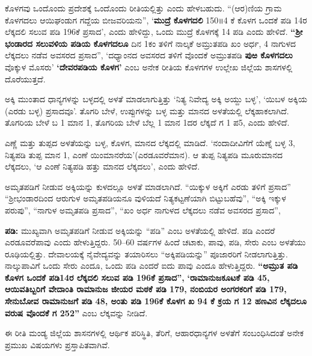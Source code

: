 ಕೊಳಗವು ಒಂದೊಂದು ಪ್ರದೇಶಕ್ಕೆ ಒಂದೊಂದು ರೀತಿಯಲ್ಲಿತ್ತು ಎಂದು ಹೇಳಬಹುದು. “(ಆರ)ಣಿಯ ಗ್ರಾಮ ಕೊಳಗದಲು ಆಯಿಘಂಡುಗ ಗದ್ದೆಯ ಬೀಜವರಿಯನು”, ‘\textbf{ಮುದ್ರೆ ಕೊಳಗದಲಿ} 150॥4 ಕೆ ಕೊಳಗ ಒಂದಕೆ ಪಡಿ 14ರ ಲೆಕ್ಕದಲಿ ಸಲುವ ಪಡಿ 196ಕೆ ಪ್ರಸಾದ’, ಎಂದು ಹೇಳಿದ್ದು, ಒಂದು ಮುದ್ರೆ ಕೊಳಗಕ್ಕೆ 14 ಪಡಿ ಎಂದು ಹೇಳಿದೆ. \textbf{“ಶ‍್ರೀ} \textbf{ಭಂಡಾರದ ಸಲುವಳಿಯ ಪಡಿಯ ಕೊಳಗದಲೂ} ದಿನ 1ಕಂ ತಳಿಗೆ ನಾಲ್ಕಕೆ ಅಮ್ರುತಪಡಿ ಖಂ ಅರ್ಧ, 4 ನಾಗುಳದ ಲೆಕ್ಕದಲು ನಡೆವ ಅವಸರದ ಪ್ರಸಾದ”, ‘ದಧ್ಯಾಂನದ ಅವಸರದ ತಳಿಗೆ ವೊಂದಕೆ ಅಮ್ರುತಪಡಿ \textbf{ಪುಱ ಕೊಳಗದಲು} ವೊಕ್ಕುಳ ಮೊಸರು’ \textbf{‘ದೇವರಪಡಿಯ ಕೊಳಗ’} ಎಂಬ ಅನೇಕ ರೀತಿಯ ಕೊಳಗಗಳ ಉಲ್ಲೇಖ ಜಿಲ್ಲೆಯ ಶಾಸಗಳಲ್ಲಿ ದೊರೆಯುತ್ತದೆ.

ಅಕ್ಕಿ ಮುಂತಾದ ಧಾನ್ಯಗಳನ್ನು ಬಳ್ಳದಲ್ಲಿ ಅಳತೆ ಮಾಡಲಾಗುತ್ತಿತ್ತು ‘ನಿತ್ಯ ನಿವೇದ್ಯ ಅಕ್ಕಿ ಅಯ್ದು ಬಳ್ಳ’, ‘ಯಿಬಳ ಅಕ್ಕಿಯ (ಎರಡು ಬಳ್ಳ) ಪ್ರಸಾದವೂ’. ತೊಗರಿ ಬೇಳೆ, ಉಪ್ಪುಗಳನ್ನು ಬಳ್ಳ ಮತ್ತು ಮಾನದ ಅಳತೆಯಲ್ಲಿ ಲೆಕ್ಕಹಾಕಲಾಗಿದೆ. ತೊಗರಿಯ ಬೇಳೆ ಬ 1 ಮಾನ 1, ತೊಗರಿಯ ಬೇಳೆ ಬೆಲ್ಲ 1 ಮಾನ 1ದರ ಲೆಕ್ಕದೆ ಗ 1 ಪ5, ಎಂದು ಹೇಳಿದೆ.

ಎಣ್ಣೆ ಮತ್ತು ತುಪ್ಪದ ಅಳತೆಯನ್ನು ಬಳ್ಳ, ಕೊಳಗ, ಮಾನದ ಲೆಕ್ಕದಲ್ಲಿ ಮಾಡಿದೆ. ‘ನಂದಾದೀವಿಗೆಗೆ ಯೆಣ್ನೆ ಬಳ್ಳ 3, ನಿತ್ಯಪಡಿ ತುಪ್ಪ ಮಾನ 1, ಎಂಣೆ ಯಿಂಮಾನರೆಯ’(ಎರಡೂವರೆಮಾನ). ಆ ತುಪ್ಪ ನಿತ್ಯಪಡಿ ಮೂರುಮಾನದ ಲೆಕ್ಕದಲು, ‘ಆ ಎಂಣೆ ನಿತ್ಯಪಡಿ ಹತ್ತು ಮಾನದ ಲೆಕ್ಕದಲು’, ಎಂದು ಹೇಳಿದೆ.

ಅಮೃತಪಡಿಗೆ ನೀಡುವ ಅಕ್ಕಿಯನ್ನು ಕುಳದಲ್ಲೂ ಅಳತೆ ಮಾಡಲಾಗಿದೆ. “ಯಿಕ್ಕುಳ ಅಕ್ಕಿಗೆ ಎರಡು ತಳಿಗೆ ಪ್ರಸಾದ” “ಶ‍್ರೀಭಂಡಾರದಿಂದ ಆರುಗುಳ ಅಮೃತಪಡಿಯನೂ ವುಳಿಯದೆ ನಿತ್ಯಕಟ್ಟಣೆಯಾಗಿ ಬಿಟ್ಟುಬಹೆವು”, “ಅಕ್ಕಿ ಇಕ್ಕುಳ ಪರುಪು”, “ನಾಗುಳ ಅಮೃತಪಡಿ ಪ್ರಸಾದ”, “ಖಂ ಅರ್ಧ ನಾಗುಳದ ಲೆಕ್ಕದಲು ನಡೆವ ಅವಸರದ ಪ್ರಸಾದ”,

\textbf{ಪಡಿ:} ಮುಖ್ಯವಾಗಿ ಅಮೃತಪಡಿಗೆ ನೀಡುವ ಅಕ್ಕಿಯನ್ನು “ಪಡಿ” ಎಂಬ ಅಳತೆಯಲ್ಲಿ ಹೇಳಿದೆ. ಪಡಿ ಎಂದರೆ ಎರಡೂವರೆಪಾವು ಎಂದು ಹೇಳುತ್ತಿದ್ದರು. 50–60 ವರ್ಷಗಳ ಹಿಂದೆ ಚಟಾಕು, ಪಾವು, ಪಡಿ, ಸೇರು ಎಂಬ ಅಳತೆಯು ರೂಢಿಯಲ್ಲಿತ್ತು. ದೇವಾಲಯಕ್ಕೆ ನೈವೇದ್ಯವನ್ನು ತಯಾರಿಸಲು “ಅಕ್ಕಿಪಡಿಯನ್ನು” ಪೂಜಾರರಿಗೆ ನೀಡಲಾಗುತ್ತಿತ್ತು. ನಾಲ್ಕುಪಾವಿಗೆ ಒಂದು ಸೇರು ಎಂದೂ, ಒಂದು ಪಡಿ ಎಂದರೆ ಐದು ಪಾವು ಎಂದೂ ಹೇಳುತ್ತಿದ್ದರು. \textbf{“ಅಮ್ರುತ ಪಡಿ ಕೊಳಗ ಒಂದಕೆ ಪಡಿ14ರ ಲೆಕ್ಕದಲಿ ಸಲುವ ಪಡಿ 196ಕೆ ಪ್ರಸಾದ”,} \textbf{‘ರಾಮಾನುಜಕೂಟಕೆ ಪಡಿ 45, ಆಯಿವತಿಬ್ಬರಿಗೆ ವೇದಾಂತಿ ರಾಮಾನುಜ ಜೀಯರ ಮಠಕೆ ಪಡಿ 179, ನಂಬಿಯರ ಅಂಗರಕರಿಗೆ ಪಡಿ 179, ಸೇನುಬೋವ ರಾಮಾನುಜಗೆ ಪಡಿ 48, ಅಂತು ಪಡಿ 196ಕೆ ಕೊಳಗ ಖ 94 ಕೆ ಕ್ರಯ ಗ 12 ಹಣವಿನ ಲೆಕ್ಕದಲೂ ವರುಷ ವೊಂದಕೆ ಗ 252”} ಎಂಬ ಲೆಕ್ಕವನ್ನು ನೀಡಿದೆ.

ಈ ರೀತಿ ಮಂಡ್ಯ ಜಿಲ್ಲೆಯ ಶಾಸನಗಳಲ್ಲಿ ಆರ್ಥಿಕ ಪರಿಸ್ಥಿತಿ, ತೆರಿಗೆ, ಆಹಾರಧಾನ್ಯಗಳ ಅಳತೆಗೆ ಸಂಬಂಧಿಸಿದಂತೆ ಅನೇಕ ಪ್ರಮುಖ ವಿಷಯಗಳು ಪ್ರಸ್ತಾಪಿತವಾಗಿವೆ.


